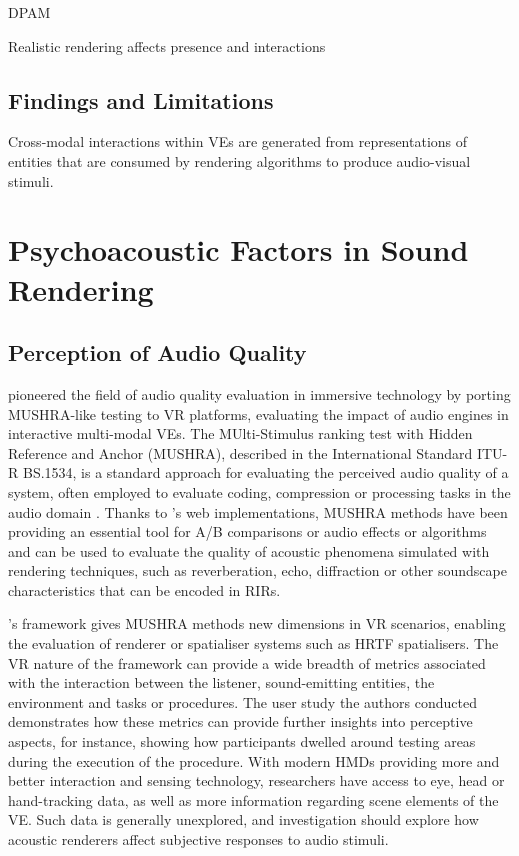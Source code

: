 DPAM



\cite{slater2009visual} Realistic rendering affects presence and interactions

\subsection{Findings and Limitations}
Cross-modal interactions within VEs are generated from representations of entities that are consumed by rendering algorithms to produce audio-visual stimuli. 


\section{Psychoacoustic Factors in Sound Rendering}
\cite{gonzalez2023binaural}

\subsection{Perception of Audio Quality}
\cite{rummukainen2018audio} pioneered the field of audio quality evaluation in immersive technology by porting MUSHRA-like testing to VR platforms, evaluating the impact of audio engines in interactive multi-modal VEs. The MUlti-Stimulus ranking test with Hidden Reference and Anchor (MUSHRA), described in the International Standard ITU-R BS.1534, is a standard approach for evaluating the perceived audio quality of a system, often employed to evaluate coding, compression or processing tasks in the audio domain \cite{series2014method}. Thanks to \cite{waet2015}'s web implementations, MUSHRA methods have been providing an essential tool for A/B comparisons or audio effects or algorithms and can be used to evaluate the quality of acoustic phenomena simulated with rendering techniques, such as reverberation, echo, diffraction or other soundscape characteristics that can be encoded in RIRs.\par
\cite{rummukainen2018audio}'s framework gives MUSHRA methods new dimensions in VR scenarios, enabling the evaluation of renderer or spatialiser systems such as HRTF spatialisers. The VR nature of the framework can provide a wide breadth of metrics associated with the interaction between the listener, sound-emitting entities, the environment and tasks or procedures. The user study the authors conducted demonstrates how these metrics can provide further insights into perceptive aspects, for instance, showing how participants dwelled around testing areas during the execution of the procedure. With modern HMDs providing more and better interaction and sensing technology, researchers have access to eye, head or hand-tracking data, as well as more information regarding scene elements of the VE. Such data is generally unexplored, and investigation should explore how acoustic renderers affect subjective responses to audio stimuli.\par


